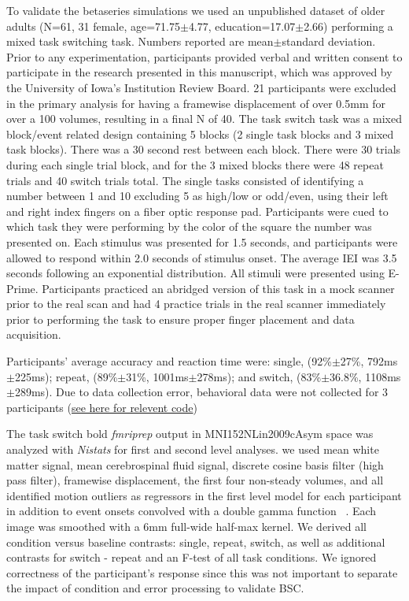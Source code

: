 \documentclass[10pt,letterpaper]{article}
\begin{document}
To validate the betaseries simulations we used an unpublished dataset
of older adults (N=61, 31 female, age=71.75$\pm$4.77, education=17.07$\pm$2.66)
performing a mixed task switching task.
Numbers reported are mean$\pm$standard deviation.
Prior to any experimentation, participants provided verbal and written consent
to participate in the research presented in this manuscript, which was approved
by the University of Iowa's Institution Review Board.
21 participants were excluded in the primary analysis for having a
framewise displacement of over 0.5mm for over a 100 volumes,
resulting in a final N of 40.
The task switch task was a mixed block/event related design containing
5 blocks (2 single task blocks and 3 mixed task blocks).
There was a 30 second rest between each block.
There were 30 trials during each single trial block,
and for the 3 mixed blocks there were 48 repeat trials and 40 switch trials total.
The single tasks consisted of identifying a number between
1 and 10 excluding 5 as high/low or odd/even, using their left and right index fingers
on a fiber optic response pad.
Participants were cued to which task they were performing by the color of the square
the number was presented on.
Each stimulus was presented for 1.5 seconds, and participants were allowed
to respond within 2.0 seconds of stimulus onset.
The average IEI was 3.5 seconds following an exponential distribution.
All stimuli were presented using E-Prime.
Participants practiced an abridged version of this task in a mock scanner
prior to the real scan and had 4 practice trials in the real scanner immediately
prior to performing the task to ensure proper finger placement and data acquisition.

Participants' average accuracy and reaction time were:
single, (92\%$\pm$27\%, 792ms$\pm$225ms); repeat, (89\%$\pm$31\%, 1001ms$\pm$278ms);
and switch, (83\%$\pm$36.8\%, 1108ms$\pm$289ms).
Due to data collection error, behavioral data were not collected for 3 participants
(\href{https://github.com/jdkent/BetaSeriesRealDataAnalysis/blob/90fafb5b83b2e1bfade61a9fb1a87f225efaa95f/summarizeBehavior/summarize_behavior.ipynb}{see here for relevent code})

The task switch bold \emph{fmriprep} output in MNI152NLin2009cAsym space
was analyzed with \emph{Nistats} for first and second level analyses.
we used mean white matter signal, mean cerebrospinal fluid signal,
discrete cosine basis filter (high pass filter), framewise displacement, the first four non-steady volumes, and
all identified motion outliers as regressors in the first level model for each participant
in addition to event onsets convolved with a double gamma function ~\cite{Glover1999}.
Each image was smoothed with a 6mm full-wide half-max kernel.
We derived all condition versus baseline contrasts: single, repeat, switch, as well as
additional contrasts for switch - repeat and an F-test of all task conditions.
We ignored correctness of the participant's response since this was not important to
separate the impact of condition and error processing to validate BSC.
\end{document}
